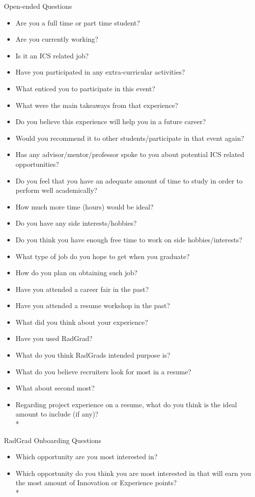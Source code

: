 \documentclass[english]{proposalnsf}
\begin{document}
  Open-ended Questions
  \begin{itemize}
    \item Are you a full time or part time student?
    \item Are you currently working?
    \item Is it an ICS related job?
    \item Have you participated in any extra-curricular activities?
    \item What enticed you to participate in this event?
    \item What were the main takeaways from that experience?
    \item Do you believe this experience will help you in a future career?
    \item Would you recommend it to other students/participate in that event again?
    \item Has any advisor/mentor/professor spoke to you about potential ICS related opportunities?
    \item Do you feel that you have an adequate amount of time to study in order to perform well academically?
    \item How much more time (hours) would be ideal?
    \item Do you have any side interests/hobbies?
    \item Do you think you have enough free time to work on side hobbies/interests?
    \item What type of job do you hope to get when you graduate?
    \item How do you plan on obtaining such job?
    \item Have you attended a career fair in the past?
    \item Have you attended a resume workshop in the past?
    \item What did you think about your experience?
    \item Have you used RadGrad?
    \item What do you think RadGrads intended purpose is?
    \item What do you believe recruiters look for most in a resume?
    \item What about second most?
    \item Regarding project experience on a resume, what do you think is the ideal amount to include (if any)?\\*
  \end{itemize}

  RadGrad Onboarding Questions
  \begin{itemize}
    \item Which opportunity are you most interested in?
    \item Which opportunity do you think you are most interested in that will earn you the most amount of Innovation or Experience points?\\*
  \end{itemize}
\end{document}
